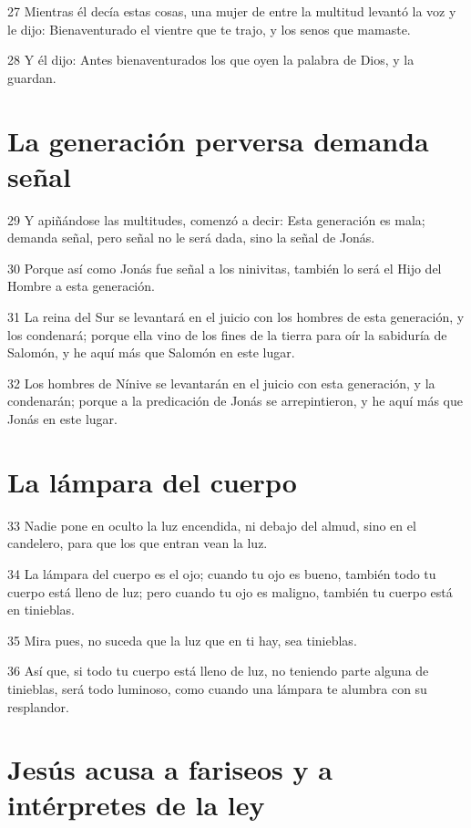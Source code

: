 \par 27 Mientras él decía estas cosas, una mujer de entre la multitud levantó la voz y le dijo: Bienaventurado el vientre que te trajo, y los senos que mamaste.
\par 28 Y él dijo: Antes bienaventurados los que oyen la palabra de Dios, y la guardan.

\section*{La generación perversa demanda señal}

\par 29 Y apiñándose las multitudes, comenzó a decir: Esta generación es mala; demanda señal, pero señal no le será dada, sino la señal de Jonás.
\par 30 Porque así como Jonás fue señal a los ninivitas, también lo será el Hijo del Hombre a esta generación.
\par 31 La reina del Sur se levantará en el juicio con los hombres de esta generación, y los condenará; porque ella vino de los fines de la tierra para oír la sabiduría de Salomón, y he aquí más que Salomón en este lugar.
\par 32 Los hombres de Nínive se levantarán en el juicio con esta generación, y la condenarán; porque a la predicación de Jonás se arrepintieron, y he aquí más que Jonás en este lugar.

\section*{La lámpara del cuerpo}

\par 33 Nadie pone en oculto la luz encendida, ni debajo del almud, sino en el candelero, para que los que entran vean la luz.
\par 34 La lámpara del cuerpo es el ojo; cuando tu ojo es bueno, también todo tu cuerpo está lleno de luz; pero cuando tu ojo es maligno, también tu cuerpo está en tinieblas.
\par 35 Mira pues, no suceda que la luz que en ti hay, sea tinieblas.
\par 36 Así que, si todo tu cuerpo está lleno de luz, no teniendo parte alguna de tinieblas, será todo luminoso, como cuando una lámpara te alumbra con su resplandor.

\section*{Jesús acusa a fariseos y a intérpretes de la ley}

